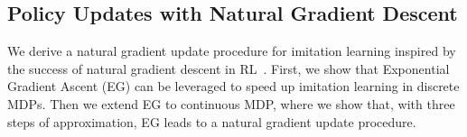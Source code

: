\documentclass{article}
\begin{document}
\subsection{Policy Updates with Natural Gradient Descent}
We derive a natural gradient update procedure for imitation learning inspired by the success of natural gradient descent in RL~\cite{kakade2002natural,bagnell2003covariant,schulman2015trust}. First, we show that Exponential Gradient Ascent (EG) can be leveraged to speed up imitation learning in discrete MDPs. Then we extend EG to continuous MDP, where we show that, with three steps of approximation, EG leads to a natural gradient update procedure. 
\end{document}
